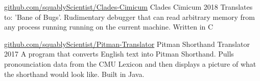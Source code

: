\documentclass{awesome-cv}
\begin{document}
		\begin{cventries}
			\cventry
				{\href{https://github.com/squablyScientist/Clades-Cimicum}{github.com/squablyScientist/Clades-Cimicum}}
				{Clades Cīmicum}
				{2018}
				{}
				{Translates to: 'Bane of Bugs'. Rudimentary debugger that can read arbitrary memory from any process running running on the current machine. Written in C}

			\cventry
				{\href{https://github.com/squablyScientist/Pitman-Translator}{github.com/squablyScientist/Pitman-Translator}}
				{Pitman Shorthand Translator}
				{2017}
				{}
				{A program that converts English text into Pitman Shorthand. Pulls pronounciation data from the CMU Lexicon and then displays a picture of what the shorthand would look like. Built in Java.}

		\end{cventries}
\end{document}
